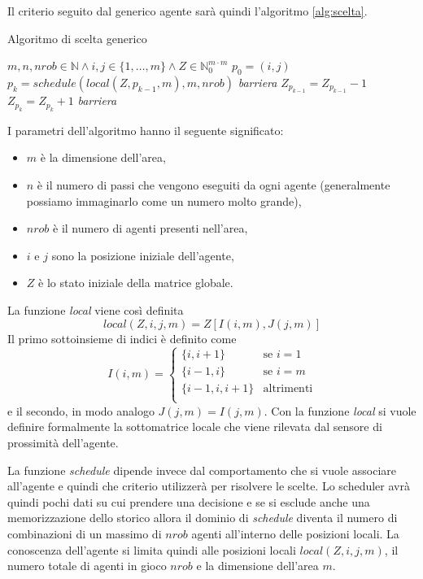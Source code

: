 Il criterio seguito dal generico agente sarà quindi l'algoritmo \ref{alg:scelta}.
\begin{algorithm}
	\caption{Algoritmo di scelta generico}
	\label{alg:scelta}
	\begin{algorithmic}
		\REQUIRE $m,n,nrob \in \mathbb{N} \wedge i,j \in \{1,\dots,m\} \wedge Z \in \mathbb{N}_0^{m\cdot m} $
		\STATE $p_0 = (i,j)$
			\STATE $p_k = schedule(local(Z,p_{k-1},m),m,nrob)$
			\STATE \emph{barriera}
			\STATE $Z_{p_{k-1}} = Z_{p_{k-1}} - 1$
			\STATE $Z_{p_{k}} = Z_{p_{k}} + 1$
			\STATE \emph{barriera}
		\ENDFOR
	\end{algorithmic}
\end{algorithm}
I parametri dell'algoritmo hanno il seguente significato:
\begin{itemize}
	\item $m$ è la dimensione dell'area,
	\item $n$ è il numero di passi che vengono eseguiti da ogni agente (generalmente possiamo immaginarlo come un numero molto grande),
	\item $nrob$ è il numero di agenti presenti nell'area,
	\item $i$ e $j$ sono la posizione iniziale dell'agente,
	\item $Z$ è lo stato iniziale della matrice globale.
\end{itemize}

La funzione \emph{local} viene così definita
$$ local(Z,i,j,m) = Z[I(i,m),J(j,m)] $$
Il primo sottoinsieme di indici è definito come
$$ I(i,m) =
\left\{
\begin{array}{ll}
	\{i, i+1\} & \mbox{se } i = 1 \\
	\{i-1, i\} & \mbox{se } i = m \\
	\{i-1, i, i+1\} & \mbox{altrimenti} \\
\end{array}
\right.
$$
e il secondo, in modo analogo $J(j,m) = I(j,m)$. Con la funzione \emph{local} si vuole definire formalmente la sottomatrice locale che viene rilevata dal sensore di prossimità dell'agente.

La funzione \emph{schedule} dipende invece dal comportamento che si vuole associare all'agente e quindi che criterio utilizzerà per risolvere le scelte. Lo scheduler avrà quindi pochi dati su cui prendere una decisione e se si esclude anche una memorizzazione dello storico allora il dominio di \emph{schedule} diventa il numero di combinazioni di un massimo di $nrob$ agenti all'interno delle posizioni locali. La conoscenza dell'agente si limita quindi alle posizioni locali $local(Z,i,j,m)$, il numero totale di agenti in gioco $nrob$ e la dimensione dell'area $m$.

